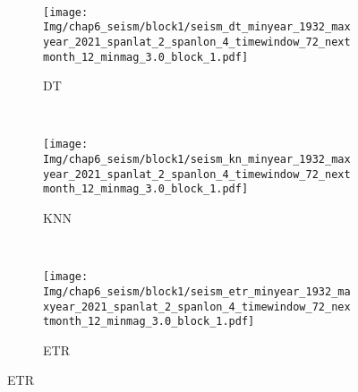 \begin{figure}[!htbp]
\begin{subfigure}[b]{0.45\textwidth}
    \vspace{-1cm}
    \label{fig:seism_gbr_minyear_1932_maxyear_2021_spanlat_2_spanlon_4_timewindow_72_nextmonth_12_minmag_3.0_block_1}
  \end{subfigure}
  ~
  \begin{subfigure}[b]{0.45\textwidth}
    \caption{DT}
    \vspace{-0.2cm}
    \texttt{[image: Img/chap6\_seism/block1/seism\_dt\_minyear\_1932\_maxyear\_2021\_spanlat\_2\_spanlon\_4\_timewindow\_72\_nextmonth\_12\_minmag\_3.0\_block\_1.pdf]}
    \vspace{-1cm}
    \label{fig:seism_dt_minyear_1932_maxyear_2021_spanlat_2_spanlon_4_timewindow_72_nextmonth_12_minmag_3.0_block_1}
  \end{subfigure}
  \\
  \begin{subfigure}[b]{0.45\textwidth}
    \caption{KNN}
    \vspace{-0.2cm}
    \texttt{[image: Img/chap6\_seism/block1/seism\_kn\_minyear\_1932\_maxyear\_2021\_spanlat\_2\_spanlon\_4\_timewindow\_72\_nextmonth\_12\_minmag\_3.0\_block\_1.pdf]}
    \vspace{-1cm}
    \label{fig:seism_knn_minyear_1932_maxyear_2021_spanlat_2_spanlon_4_timewindow_72_nextmonth_12_minmag_3.0_block_1}
  \end{subfigure}
  ~
  \begin{subfigure}[b]{0.45\textwidth}
    \caption{ETR}
    \vspace{-0.2cm}
    \texttt{[image: Img/chap6\_seism/block1/seism\_etr\_minyear\_1932\_maxyear\_2021\_spanlat\_2\_spanlon\_4\_timewindow\_72\_nextmonth\_12\_minmag\_3.0\_block\_1.pdf]}
    \vspace{-1cm}
    \label{fig:seism_etr_minyear_1932_maxyear_2021_spanlat_2_spanlon_4_timewindow_72_nextmonth_12_minmag_3.0_block_1}
  \end{subfigure}
  \label{fig:seism_minyear_1932_maxyear_2021_spanlat_2_spanlon_4_timewindow_72_nextmonth_12_minmag_3.0_block_1}
\end{figure}

